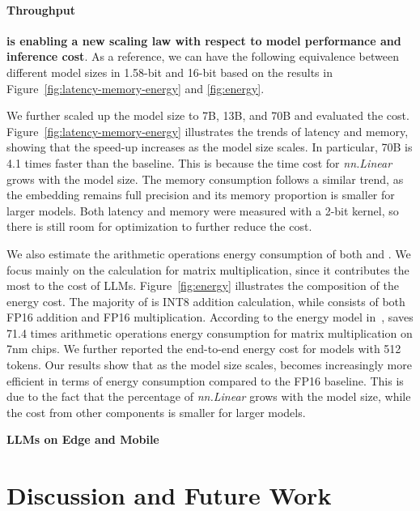 \paragraph{Throughput}

\textbf{ is enabling a new scaling law with respect to model performance and inference cost}. As a reference, we can have the following equivalence between different model sizes in 1.58-bit and 16-bit based on the results in Figure~\ref{fig:latency-memory-energy} and \ref{fig:energy}.

We further scaled up the model size to 7B, 13B, and 70B and evaluated the cost. Figure~\ref{fig:latency-memory-energy} illustrates the trends of latency and memory, showing that the speed-up increases as the model size scales. In particular,  70B is 4.1 times faster than the  baseline. This is because the time cost for \emph{nn.Linear} grows with the model size. The memory consumption follows a similar trend, as the embedding remains full precision and its memory proportion is smaller for larger models. Both latency and memory were measured with a 2-bit kernel, so there is still room for optimization to further reduce the cost.

We also estimate the arithmetic operations energy consumption of both  and .
We focus mainly on the calculation for matrix multiplication, since it contributes the most to the cost of LLMs. Figure~\ref{fig:energy} illustrates the composition of the energy cost. The majority of  is INT8 addition calculation, while  consists of both FP16 addition and FP16 multiplication. According to the energy model in~\cite{energycost, pokebnn},  saves 71.4 times arithmetic operations energy consumption for matrix multiplication on 7nm chips. We further reported the end-to-end energy cost for models with 512 tokens. Our results show that as the model size scales,  becomes increasingly more efficient in terms of energy consumption compared to the FP16  baseline. This is due to the fact that the percentage of \emph{nn.Linear} grows with the model size, while the cost from other components is smaller for larger models.



\textbf{LLMs on Edge and Mobile}

\section{Discussion and Future Work}


